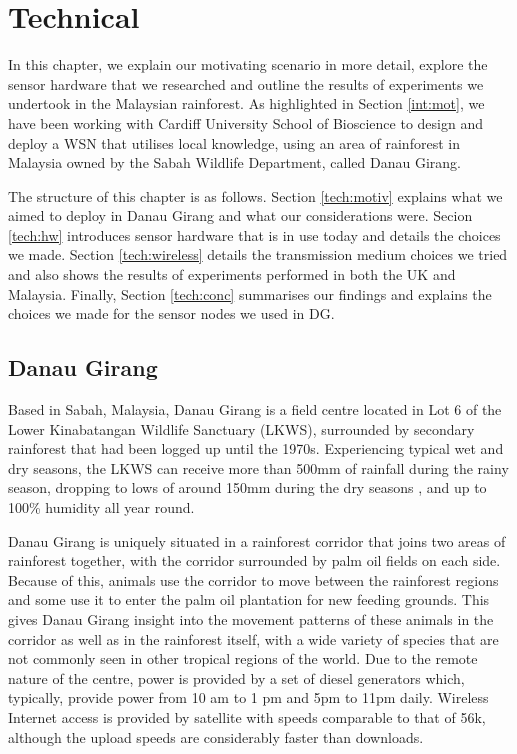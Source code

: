 \chapter{Technical}\label{chap:technical}
	In this chapter, we explain our motivating scenario in more detail, explore the sensor hardware that we researched and outline the results of experiments we undertook in the Malaysian rainforest. As highlighted in Section \ref{int:mot}, we have been working with Cardiff University School of Bioscience to design and deploy a WSN that utilises local knowledge, using an area of rainforest in Malaysia owned by the Sabah Wildlife Department, called Danau Girang.

The structure of this chapter is as follows. Section \ref{tech:motiv} explains what we aimed to deploy in Danau Girang and what our considerations were. Secion \ref{tech:hw} introduces sensor hardware that is in use today and details the choices we made. Section \ref{tech:wireless} details the transmission medium choices we tried and also shows the results of experiments performed in both the UK and Malaysia. Finally, Section \ref{tech:conc} summarises our findings and explains the choices we made for the sensor nodes we used in DG. 

\section{Danau Girang}
	Based in Sabah, Malaysia, Danau Girang is a field centre located in Lot 6 of the Lower Kinabatangan Wildlife Sanctuary (LKWS), surrounded by secondary rainforest that had been logged up until the 1970s. Experiencing typical wet and dry seasons, the LKWS can receive more than 500mm of rainfall during the rainy season, dropping to lows of around 150mm during the dry seasons \cite{Walsh2009}, and up to 100\% humidity all year round. 

Danau Girang is uniquely situated in a rainforest corridor that joins two areas of rainforest together, with the corridor surrounded by palm oil fields on each side. Because of this, animals use the corridor to move between the rainforest regions and some use it to enter the palm oil plantation for new feeding grounds. This gives Danau Girang insight into the movement patterns of these animals in the corridor as well as in the rainforest itself, with a wide variety of species that are not commonly seen in other tropical regions of the world. Due to the remote nature of the centre, power is provided by a set of diesel generators which, typically, provide power from 10 am to 1 pm and 5pm to 11pm daily. Wireless Internet access is provided by satellite with speeds comparable to that of 56k, although the upload speeds are considerably faster than downloads.

